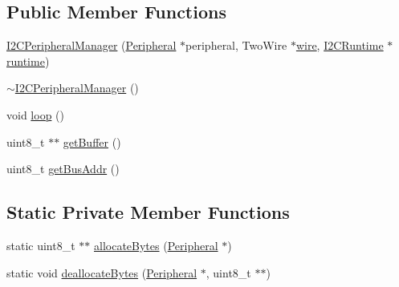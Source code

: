 \subsection*{Public Member Functions}
\begin{DoxyCompactItemize}
\item 
\mbox{\hyperlink{class_i2_c_peripheral_manager_a1e0399fb1723c895e13997275b686790}{I2\+C\+Peripheral\+Manager}} (\mbox{\hyperlink{struct_peripheral}{Peripheral}} $\ast$peripheral, Two\+Wire $\ast$\mbox{\hyperlink{main_8cpp_ab8d8f9af97a698a5a73132c347acbaf4}{wire}}, \mbox{\hyperlink{class_i2_c_runtime}{I2\+C\+Runtime}} $\ast$\mbox{\hyperlink{main_8cpp_a1fa047c23d7c85d1ad97022cd6b157d0}{runtime}})
\item 
\mbox{\hyperlink{class_i2_c_peripheral_manager_aee8ee79532efd6cfd2e684f0528bf1ba}{$\sim$\+I2\+C\+Peripheral\+Manager}} ()
\item 
void \mbox{\hyperlink{class_i2_c_peripheral_manager_a528b94dd1fbb9271a0e8bf7d4c4e53b6}{loop}} ()
\item 
uint8\+\_\+t $\ast$$\ast$ \mbox{\hyperlink{class_i2_c_peripheral_manager_a0405f2a121ad0c1c62a34104ebf8adff}{get\+Buffer}} ()
\item 
uint8\+\_\+t \mbox{\hyperlink{class_i2_c_peripheral_manager_ab0491e2a0f08b02533a96aae26003542}{get\+Bus\+Addr}} ()
\end{DoxyCompactItemize}
\subsection*{Static Private Member Functions}
\begin{DoxyCompactItemize}
\item 
static uint8\+\_\+t $\ast$$\ast$ \mbox{\hyperlink{class_i2_c_peripheral_manager_ac97eada0dc89503e0cc9ea56a6124ad0}{allocate\+Bytes}} (\mbox{\hyperlink{struct_peripheral}{Peripheral}} $\ast$)
\item 
static void \mbox{\hyperlink{class_i2_c_peripheral_manager_a4b1ea76c3c967214a21e1470c0176920}{deallocate\+Bytes}} (\mbox{\hyperlink{struct_peripheral}{Peripheral}} $\ast$, uint8\+\_\+t $\ast$$\ast$)
\end{DoxyCompactItemize}
